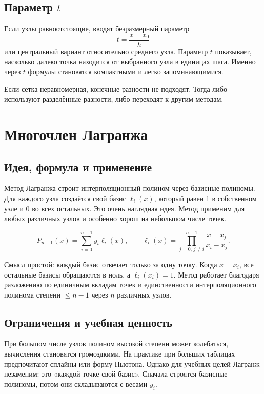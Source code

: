 \documentclass[12pt,a4paper]{article}
\begin{document}
\subsection{Параметр $t$}
Если узлы равноотстоящие, вводят безразмерный параметр
\[
 t=\frac{x-x_0}{h}
\]
или центральный вариант относительно среднего узла. Параметр $t$ показывает, насколько далеко точка находится от выбранного узла в единицах шага. Именно через $t$ формулы становятся компактными и легко запоминающимися.

\begin{notebox}
Если сетка неравномерная, конечные разности не подходят. Тогда либо используют разделённые разности, либо переходят к другим методам.
\end{notebox}

\section{Многочлен Лагранжа}
\subsection{Идея, формула и применение}

Метод Лагранжа строит интерполяционный полином через базисные полиномы. Для каждого узла создаётся свой базис $\ell_i(x)$, который равен 1 в собственном узле и 0 во всех остальных. Это очень наглядная идея. Метод применим для любых различных узлов и особенно хорош на небольшом числе точек.

\begin{formbox}
\[
P_{n-1}(x)=\sum_{i=0}^{n-1} y_i\ell_i(x),
\qquad
\ell_i(x)=\prod_{j=0,\,j\ne i}^{n-1}\frac{x-x_j}{x_i-x_j}.
\]
\end{formbox}

Смысл простой: каждый базис отвечает только за одну точку. Когда $x=x_i$, все остальные базисы обращаются в ноль, а $\ell_i(x_i)=1$. Метод работает благодаря разложению по единичным вкладам точек и единственности интерполяционного полинома степени $\le n-1$ через $n$ различных узлов.

\subsection{Ограничения и учебная ценность}

При большом числе узлов полином высокой степени может колебаться, вычисления становятся громоздкими. На практике при больших таблицах предпочитают сплайны или форму Ньютона. Однако для учебных целей Лагранж незаменим: это «каждой точке свой базис». Сначала строятся базисные полиномы, потом они складываются с весами $y_i$.
\end{document}
